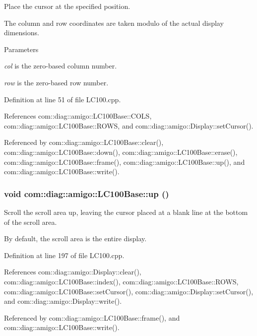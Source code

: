 Place the cursor at the specified position. 

The column and row coordinates are taken modulo of the actual display dimensions. 
\begin{DoxyParams}{Parameters}
\item[{\em col}]is the zero-\/based column number. \item[{\em row}]is the zero-\/based row number. \end{DoxyParams}


Definition at line 51 of file LC100.cpp.



References com::diag::amigo::LC100Base::COLS, com::diag::amigo::LC100Base::ROWS, and com::diag::amigo::Display::setCursor().



Referenced by com::diag::amigo::LC100Base::clear(), com::diag::amigo::LC100Base::down(), com::diag::amigo::LC100Base::erase(), com::diag::amigo::LC100Base::frame(), com::diag::amigo::LC100Base::up(), and com::diag::amigo::LC100Base::write().

\hypertarget{classcom_1_1diag_1_1amigo_1_1LC100Base_a836be0f28470396a23a3c28ef835c33d}{
\subsubsection[{up}]{\setlength{\rightskip}{0pt plus 5cm}void com::diag::amigo::LC100Base::up ()}}
\label{classcom_1_1diag_1_1amigo_1_1LC100Base_a836be0f28470396a23a3c28ef835c33d}


Scroll the scroll area up, leaving the cursor placed at a blank line at the bottom of the scroll area. 

By default, the scroll area is the entire display. 

Definition at line 197 of file LC100.cpp.



References com::diag::amigo::Display::clear(), com::diag::amigo::LC100Base::index(), com::diag::amigo::LC100Base::ROWS, com::diag::amigo::LC100Base::setCursor(), com::diag::amigo::Display::setCursor(), and com::diag::amigo::Display::write().



Referenced by com::diag::amigo::LC100Base::frame(), and com::diag::amigo::LC100Base::write().

